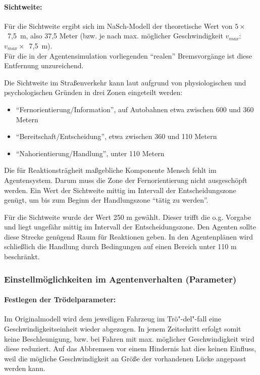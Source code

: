 \paragraph*{Sichtweite:}
\label{sec:sichtweite}
Für die Sichtweite ergibt sich im NaSch-Modell der theoretische Wert von \mbox{$ 5 \times $ 7,5 m}, also 37,5 Meter (bzw. je nach max. möglicher Geschwindigkeit  $ v_{max} $: \mbox{$ v_{max} \times $ 7,5 m}).
\\
Für die in der Agentensimulation vorliegenden \enquote{realen} Bremsvorgänge ist diese Entfernung unzureichend. 

Die Sichtweite im Straßenverkehr kann laut \cite{sichtweite} aufgrund von physiologischen und psychologischen Gründen in drei Zonen eingeteilt werden:
\begin{itemize}
\itemsep0em
	\item \enquote{Fernorientierung/Information}, auf Autobahnen etwa zwischen 600 und 360 Metern
	\item \enquote{Bereitschaft/Entscheidung}, etwa zwischen 360 und 110 Metern
	\item \enquote{Nahorientierung/Handlung}, unter 110 Metern
\end{itemize}

Die für Reaktionsträgheit maßgebliche Komponente Mensch fehlt im Agentensystem. 
Darum muss die Zone der Fernorientierung nicht ausgeschöpft werden.
Ein Wert der Sichtweite mittig im Intervall der Entscheidungszone genügt, um bis zum Beginn der Handlungszone \enquote{tätig zu werden}.

Für die Sichtweite wurde der Wert 250 m gewählt.
Dieser trifft die o.g. Vorgabe und liegt ungefähr mittig im Intervall der Entscheidungszone. Den Agenten sollte diese Strecke genügend Raum für Reaktionen geben. 
In den Agentenplänen wird schließlich die Handlung durch Bedingungen auf einen Bereich unter 110 m beschränkt.


\subsubsection{Einstellmöglichkeiten im Agentenverhalten (Parameter)}

\paragraph*{Festlegen der Trödelparameter:}
\label{sec:lingersweetspot}

Im Originalmodell wird dem jeweiligen Fahrzeug im Trö"-del"-fall eine Geschwindigkeitseinheit wieder abgezogen. 
In jenem Zeitschritt erfolgt somit keine Beschleunigung, bzw. bei Fahren mit max. möglicher Geschwindigkeit wird diese reduziert. 
Auf das Abbremsen vor einem Hindernis hat dies keinen Einfluss, weil die mögliche Geschwindigkeit an Größe der vorhandenen Lücke angepasst werden kann.

